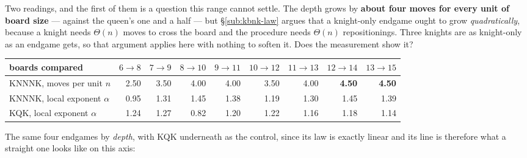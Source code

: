 \documentclass[11pt]{article}
\begin{document}
\noindent
Two readings, and the first of them is a question this range cannot settle.
The depth grows by \textbf{about four moves for every unit of board size} ---
against the queen's one and a half --- but \S\ref{sub:kbnk-law} argues that a knight-only
endgame ought to grow \emph{quadratically}, because a knight needs $\Theta(n)$
moves to cross the board and the procedure needs $\Theta(n)$ repositionings.
Three knights are as knight-only as an endgame gets, so that argument applies
here with nothing to soften it. Does the measurement show it?

\begin{center}\small
\begin{tabular}{@{}lrrrrrrrr@{}}
\toprule
boards compared & $6{\to}8$ & $7{\to}9$ & $8{\to}10$ & $9{\to}11$ & $10{\to}12$ & $11{\to}13$ & $12{\to}14$ & $13{\to}15$ \\
\midrule
KNNNK, moves per unit $n$ & 2.50 & 3.50 & 4.00 & 4.00 & 3.50 & 4.00 & \textbf{4.50} & \textbf{4.50} \\
KNNNK, local exponent $\alpha$ & 0.95 & 1.31 & 1.45 & 1.38 & 1.19 & 1.30 & 1.45 & 1.39 \\
\addlinespace
KQK, local exponent $\alpha$ & 1.24 & 1.27 & 0.82 & 1.20 & 1.22 & 1.16 & 1.18 & 1.14 \\
\bottomrule
\end{tabular}
\end{center}

\noindent
The same four endgames by \emph{depth}, with KQK underneath as the control,
since its law is exactly linear and its line is therefore what a straight one
looks like on this axis:
\end{document}

